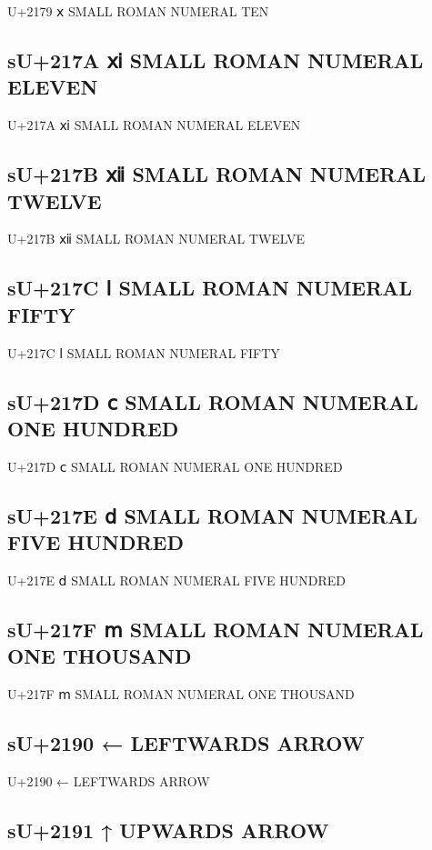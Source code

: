 U+2179 ⅹ SMALL ROMAN NUMERAL TEN

\subsection{sU+217A ⅺ SMALL ROMAN NUMERAL ELEVEN}

U+217A ⅺ SMALL ROMAN NUMERAL ELEVEN

\subsection{sU+217B ⅻ SMALL ROMAN NUMERAL TWELVE}

U+217B ⅻ SMALL ROMAN NUMERAL TWELVE

\subsection{sU+217C ⅼ SMALL ROMAN NUMERAL FIFTY}

U+217C ⅼ SMALL ROMAN NUMERAL FIFTY

\subsection{sU+217D ⅽ SMALL ROMAN NUMERAL ONE HUNDRED}

U+217D ⅽ SMALL ROMAN NUMERAL ONE HUNDRED

\subsection{sU+217E ⅾ SMALL ROMAN NUMERAL FIVE HUNDRED}

U+217E ⅾ SMALL ROMAN NUMERAL FIVE HUNDRED

\subsection{sU+217F ⅿ SMALL ROMAN NUMERAL ONE THOUSAND}

U+217F ⅿ SMALL ROMAN NUMERAL ONE THOUSAND

\subsection{sU+2190 ←  LEFTWARDS ARROW}

U+2190 ←  LEFTWARDS ARROW

\subsection{sU+2191 ↑  UPWARDS ARROW}

